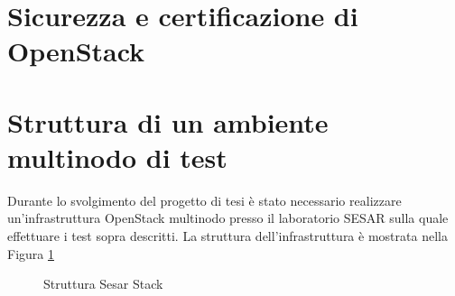 \section{Sicurezza e certificazione di OpenStack}
\vfill
\newpage
\section{Struttura di un ambiente multinodo di test}
Durante lo svolgimento del progetto di tesi è stato necessario realizzare un'infrastruttura OpenStack multinodo presso il laboratorio SESAR sulla quale effettuare i test sopra descritti.
La struttura dell'infrastruttura è mostrata nella Figura \ref{SesarStack}
\begin{figure}[H]
\centering
{}
\caption{Struttura Sesar Stack}\label{SesarStack}
\end{figure}